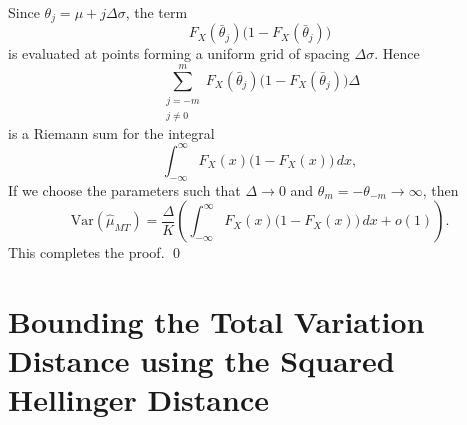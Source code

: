 \documentclass[10pt]{article} %
\theoremstyle{plain}
\theoremstyle{definition}
\theoremstyle{remark}
\newcommand{\rvar}{\mathrm{Var}}
\begin{document}
Since $\theta_j=\mu+j\Delta\sigma$, the term
\[
F_{X}(\bar{\theta}_j)\bigl(1-F_{X}(\bar{\theta}_j)\bigr)
\]
is evaluated at points forming a uniform grid of spacing $\Delta\sigma$.
Hence
\[
\sum_{\substack{j=-m \\ j\neq 0}}^{m}
F_{X}(\bar{\theta}_j)\bigl(1-F_{X}(\bar{\theta}_j)\bigr)\Delta
\]
is a Riemann sum for the integral
\[
\int_{-\infty}^{\infty}
F_{X}(x)\bigl(1-F_{X}(x)\bigr)\,dx,
\]
If we choose the parameters such that  $\Delta\to 0$ and $\theta_m=-\theta_{-m}\to\infty$, then
\[
\rvar(\hat{\mu}_{MT})
=
\frac{\Delta}{K}
\left(
\int_{-\infty}^{\infty}
F_{X}(x)\bigl(1-F_{X}(x)\bigr)\,dx
+
o(1)
\right).
\]
This completes the proof.
\qed



\section{Bounding the Total Variation Distance using the Squared Hellinger Distance}
\label{sec:prf_lemma_bound_sqhellinger}
\end{document}

